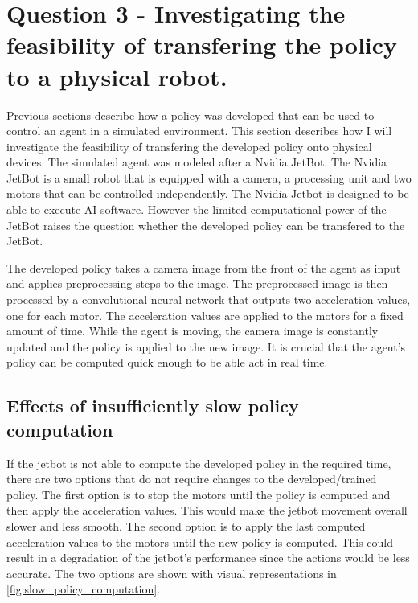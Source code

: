 \section{Question 3 - Investigating the feasibility of transfering the policy to a physical robot.}

Previous sections describe how a policy was developed that can be used to control an agent in a simulated environment. This section describes how I will investigate the feasibility of transfering the developed policy onto physical devices. The simulated agent was modeled after a Nvidia JetBot. The Nvidia JetBot is a small robot that is equipped with a camera, a processing unit and two motors that can be controlled independently.
The Nvidia Jetbot is designed to be able to execute AI software. However the limited computational power of the JetBot raises the question whether the developed policy can be transfered to the JetBot.

The developed policy takes a camera image from the front of the agent as input and applies preprocessing steps to the image. The preprocessed image is then processed by a convolutional neural network that outputs two acceleration values, one for each motor. The acceleration values are applied to the motors for a fixed amount of time. While the agent is moving, the camera image is constantly updated and the policy is applied to the new image. It is crucial that the agent's policy can be computed quick enough to be able act in real time.

\subsection*{Effects of insufficiently slow policy computation}
If the jetbot is not able to compute the developed policy in the required time, there are two options that do not require changes to the developed/trained policy. The first option is to stop the motors until the policy is computed and then apply the acceleration values. This would make the jetbot movement overall slower and less smooth.
The second option is to apply the last computed acceleration values to the motors until the new policy is computed. This could result in a degradation of the jetbot's performance since the actions would be less accurate.
The two options are shown with visual representations in \ref{fig:slow_policy_computation}.




\newcommand{\spc}[2]{\subfigure[#1]{\texttt{[image: Bilder/slow\_policy\_computation/\#2.png]}}}

